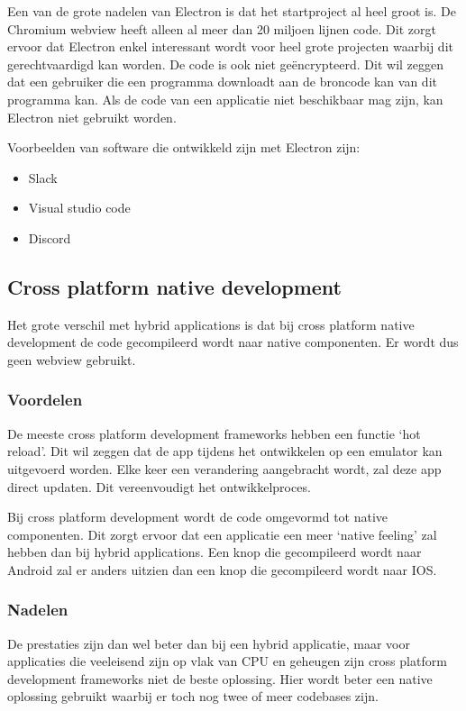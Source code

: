 		Een van de grote nadelen van Electron is dat het startproject al heel groot is. De Chromium webview heeft alleen al meer dan 20 miljoen lijnen code. Dit zorgt ervoor dat Electron enkel interessant wordt voor heel grote projecten waarbij dit gerechtvaardigd kan worden.
		De code is ook niet geëncrypteerd. Dit wil zeggen dat een gebruiker die een programma downloadt aan de broncode kan van dit programma kan. Als de code van een applicatie niet beschikbaar mag zijn, kan Electron niet gebruikt worden.
		
		Voorbeelden van software die ontwikkeld zijn met Electron zijn:
		\begin{itemize}
			\item	Slack
			\item	Visual studio code
			\item	Discord
		\end{itemize}

		
		

\subsection{Cross platform native development}
Het grote verschil met hybrid applications is dat bij cross platform native development de code gecompileerd wordt naar native componenten. Er wordt dus geen webview gebruikt.


\autocite{Ghinea2018}
\autocite{DeConinck2019}
	\subsubsection{Voordelen}
		De meeste cross platform development frameworks hebben een functie ‘hot reload’. Dit wil zeggen dat de app tijdens het ontwikkelen op een emulator kan uitgevoerd worden. Elke keer een verandering aangebracht wordt, zal deze app direct updaten. Dit vereenvoudigt het ontwikkelproces. 
		
		Bij cross platform development wordt de code omgevormd tot native componenten. Dit zorgt ervoor dat een applicatie een meer ‘native feeling’ zal hebben dan bij hybrid applications. Een knop die gecompileerd wordt naar Android zal er anders uitzien dan een knop die gecompileerd wordt naar IOS.
	
		\autocite{Asp2017}
	
	\subsubsection{Nadelen}
		De prestaties zijn dan wel beter dan bij een hybrid applicatie, maar voor applicaties die veeleisend zijn op vlak van CPU en geheugen zijn cross platform development frameworks niet de beste oplossing. Hier wordt beter een native oplossing gebruikt waarbij er toch nog twee of meer codebases zijn.
		
